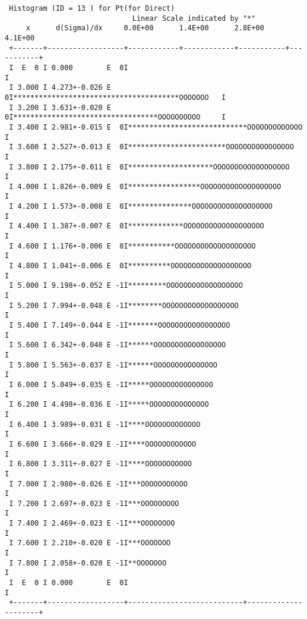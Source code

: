 \begin{small}
\begin{verbatim}
 Histogram (ID = 13 ) for Pt(for Direct)                                                  
                              Linear Scale indicated by "*"
     x      d(Sigma)/dx     0.0E+00      1.4E+00      2.8E+00     4.1E+00      
 +-------+------------------+------------+------------+-----------+-----------+
 I  E  0 I 0.000        E  0I                                                 I
 I 3.000 I 4.273+-0.026 E  0I***************************************OOOOOOO   I
 I 3.200 I 3.631+-0.020 E  0I**********************************OOOOOOOOOO     I
 I 3.400 I 2.981+-0.015 E  0I****************************OOOOOOOOOOOOO        I
 I 3.600 I 2.527+-0.013 E  0I***********************OOOOOOOOOOOOOOOO          I
 I 3.800 I 2.175+-0.011 E  0I********************OOOOOOOOOOOOOOOOOO           I
 I 4.000 I 1.826+-0.009 E  0I*****************OOOOOOOOOOOOOOOOOOO             I
 I 4.200 I 1.573+-0.008 E  0I***************OOOOOOOOOOOOOOOOOOO               I
 I 4.400 I 1.387+-0.007 E  0I*************OOOOOOOOOOOOOOOOOOO                 I
 I 4.600 I 1.176+-0.006 E  0I***********OOOOOOOOOOOOOOOOOOO                   I
 I 4.800 I 1.041+-0.006 E  0I**********OOOOOOOOOOOOOOOOOOO                    I
 I 5.000 I 9.198+-0.052 E -1I*********OOOOOOOOOOOOOOOOOO                      I
 I 5.200 I 7.994+-0.048 E -1I********OOOOOOOOOOOOOOOOOO                       I
 I 5.400 I 7.149+-0.044 E -1I*******OOOOOOOOOOOOOOOOO                         I
 I 5.600 I 6.342+-0.040 E -1I******OOOOOOOOOOOOOOOOO                          I
 I 5.800 I 5.563+-0.037 E -1I******OOOOOOOOOOOOOOO                            I
 I 6.000 I 5.049+-0.035 E -1I*****OOOOOOOOOOOOOOO                             I
 I 6.200 I 4.498+-0.036 E -1I*****OOOOOOOOOOOOOO                              I
 I 6.400 I 3.989+-0.031 E -1I****OOOOOOOOOOOOO                                I
 I 6.600 I 3.666+-0.029 E -1I****OOOOOOOOOOOO                                 I
 I 6.800 I 3.311+-0.027 E -1I****OOOOOOOOOOO                                  I
 I 7.000 I 2.980+-0.026 E -1I***OOOOOOOOOOO                                   I
 I 7.200 I 2.697+-0.023 E -1I***OOOOOOOOO                                     I
 I 7.400 I 2.469+-0.023 E -1I***OOOOOOOO                                      I
 I 7.600 I 2.210+-0.020 E -1I***OOOOOOO                                       I
 I 7.800 I 2.058+-0.020 E -1I**OOOOOOO                                        I
 I  E  0 I 0.000        E  0I                                                 I
 +-------+------------------+---------------------------+---------------------+

\end{verbatim}
\end{small}
